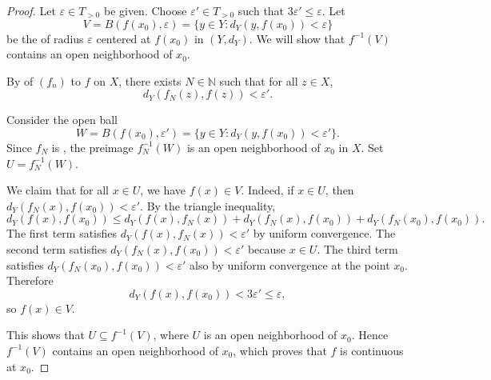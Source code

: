\begin{proof}
Let $\varepsilon \in T_{>0}$ be given. Choose $\varepsilon' \in T_{>0}$ such that $3\varepsilon' \leq \varepsilon$. Let
$$V = B(f(x_0), \varepsilon) = \{ y \in Y : d_Y(y, f(x_0)) < \varepsilon \}$$
be the  of radius $\varepsilon$ centered at $f(x_0)$ in $(Y, d_Y)$. We will show that $f^{-1}(V)$ contains an open neighborhood of $x_0$.

By  of $(f_n)$ to $f$ on $X$, there exists $N \in \mathbb{N}$ such that for all $z \in X$,
$$d_Y(f_N(z), f(z)) < \varepsilon'.$$

Consider the open ball
$$W = B(f(x_0), \varepsilon') = \{ y \in Y : d_Y(y, f(x_0)) < \varepsilon' \}.$$
Since $f_N$ is , the preimage $f_N^{-1}(W)$ is an open neighborhood of $x_0$ in $X$. Set $U = f_N^{-1}(W)$.

We claim that for all $x \in U$, we have $f(x) \in V$. Indeed, if $x \in U$, then $d_Y(f_N(x), f(x_0)) < \varepsilon'$. By the triangle inequality,
$$d_Y(f(x), f(x_0)) \leq d_Y(f(x), f_N(x)) + d_Y(f_N(x), f(x_0)) + d_Y(f_N(x_0), f(x_0)).$$
The first term satisfies $d_Y(f(x), f_N(x)) < \varepsilon'$ by uniform convergence. The second term satisfies $d_Y(f_N(x), f(x_0)) < \varepsilon'$ because $x \in U$. The third term satisfies $d_Y(f_N(x_0), f(x_0)) < \varepsilon'$ also by uniform convergence at the point $x_0$. Therefore
$$d_Y(f(x), f(x_0)) < 3\varepsilon' \leq \varepsilon,$$
so $f(x) \in V$.

This shows that $U \subseteq f^{-1}(V)$, where $U$ is an open neighborhood of $x_0$. Hence $f^{-1}(V)$ contains an open neighborhood of $x_0$, which proves that $f$ is continuous at $x_0$.
\end{proof}
